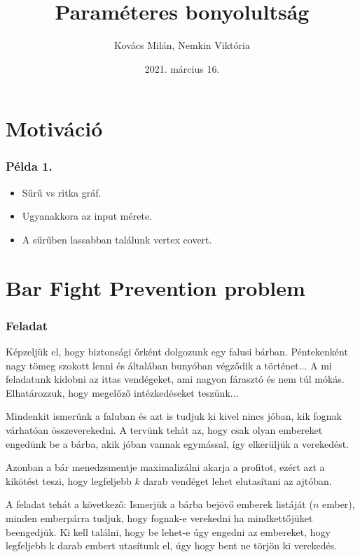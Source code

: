 \documentclass[aspectratio=169]{beamer}
\begin{document}
\title{Paraméteres bonyolultság}
\author{Kovács Milán, Nemkin Viktória}
\date{2021. március 16.}

\frame{\titlepage}



\section{Motiváció}

\begin{frame}
\frametitle{Példa 1.}
\begin{itemize}
\item Sűrű vs ritka gráf.
\item Ugyanakkora az input mérete.
\item A sűrűben lassabban találunk vertex covert.
\end{itemize}
\end{frame}



\section{Bar Fight Prevention problem}

\begin{frame}
\frametitle{Feladat}
Képzeljük el, hogy biztonsági őrként dolgozunk egy falusi bárban. Péntekenként nagy tömeg szokott lenni és
általában bunyóban végződik a történet... A mi feladatunk kidobni az ittas vendégeket, ami nagyon fárasztó
és nem túl mókás. Elhatározzuk, hogy megelőző intézkedéseket teszünk...

Mindenkit ismerünk a faluban és azt is tudjuk ki kivel nincs jóban, kik fognak várhatóan összeverekedni.
A tervünk tehát az, hogy csak olyan embereket engedünk be a bárba, akik jóban vannak egymással, így
elkerüljük a verekedést.

Azonban a bár menedzsmentje maximalizálni akarja a profitot, ezért azt a kikötést teszi, hogy legfeljebb
$k$ darab vendéget lehet elutasítani az ajtóban.

A feladat tehát a következő: Ismerjük a bárba bejövő emberek listáját ($n$ ember), minden emberpárra
tudjuk, hogy fognak-e verekedni ha mindkettőjüket beengedjük. Ki kell találni, hogy be lehet-e úgy
engedni az embereket, hogy legfeljebb k darab embert utasítunk el, úgy hogy bent ne törjön ki verekedés.
\end{frame}
\end{document}
